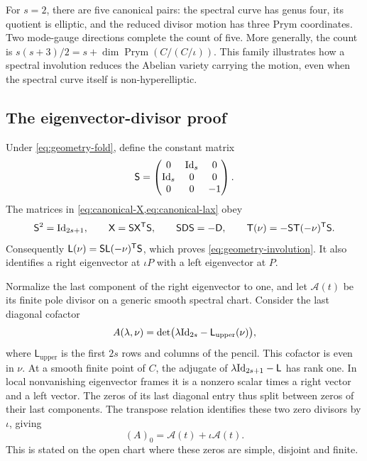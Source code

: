 For $s=2$, there are five canonical pairs: the spectral curve has
genus four, its quotient is elliptic, and the reduced divisor motion
has three Prym coordinates. Two mode-gauge directions complete the
count of five. More generally, the count is
$s(s+3)/2=s+\dim\operatorname{Prym}(C/(C/\iota))$.
This family illustrates how a spectral involution reduces the
Abelian variety carrying the motion, even when the spectral curve
itself is non-hyperelliptic.

\subsection{The eigenvector-divisor proof}

Under \cref{eq:geometry-fold}, define the constant matrix
\begin{equation}\label{eq:prym-transpose}
 \mathsf S=\begin{pmatrix}
 0&\mathrm{Id}_s&0\\ \mathrm{Id}_s&0&0\\ 0&0&-1
 \end{pmatrix}.
\end{equation}
The matrices in \cref{eq:canonical-X,eq:canonical-lax} obey
\begin{equation}\label{eq:prym-pencil-duality}
 \mathsf S^2=\mathrm{Id}_{2s+1},\qquad
 \mathsf X=\mathsf S\mathsf X^{\mathsf T}\mathsf S,\qquad
 \mathsf S\mathsf D\mathsf S=-\mathsf D,\qquad
 \mathsf T(\nu)=-\mathsf S\mathsf T(-\nu)^{\mathsf T}\mathsf S.
\end{equation}
Consequently
$\mathsf L(\nu)=\mathsf S\mathsf L(-\nu)^{\mathsf T}\mathsf S$,
which proves \cref{eq:geometry-involution}. It also identifies a
right eigenvector at $\iota P$ with a left eigenvector at $P$.

Normalize the last component of the right eigenvector to one, and
let $\mathcal A(t)$ be its finite pole divisor on a generic smooth
spectral chart. Consider the last diagonal cofactor
\begin{equation}\label{eq:prym-cofactor}
 A(\lambda,\nu)=
 \det\bigl(\lambda\mathrm{Id}_{2s}-\mathsf L_{\mathrm{upper}}(\nu)\bigr),
\end{equation}
where $\mathsf L_{\mathrm{upper}}$ is the first $2s$ rows and
columns of the pencil. This cofactor is even in $\nu$.
At a smooth finite point of $C$, the adjugate of
$\lambda\mathrm{Id}_{2s+1}-\mathsf L$ has rank one. In local nonvanishing
eigenvector frames it is a nonzero scalar times a right vector and
a left vector. The zeros of its last diagonal entry thus split
between zeros of their last components. The transpose relation
identifies these two zero divisors by $\iota$, giving
\begin{equation}\label{eq:prym-divisor}
 (A)_0=\mathcal A(t)+\iota\mathcal A(t).
\end{equation}
This is stated on the open chart where these zeros are simple,
disjoint and finite.

